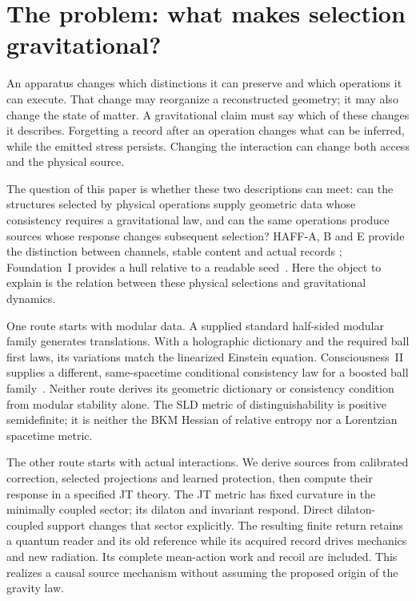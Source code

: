 \documentclass[12pt,a4paper]{article}
\begin{document}
\section{The problem: what makes selection gravitational?}
\label{sec:intro}

An apparatus changes which distinctions it can preserve and which operations
it can execute. That change may reorganize a reconstructed geometry; it may
also change the state of matter. A gravitational claim must say which of
these changes it describes. Forgetting a record after an operation changes
what can be inferred, while the emitted stress persists. Changing the
interaction can change both access and the physical source.

The question of this paper is whether these two descriptions can meet:
can the structures selected by physical operations supply geometric data
whose consistency requires a gravitational law, and can the same operations
produce sources whose response changes subsequent selection? HAFF-A, B and E
provide the distinction between channels, stable content and actual records
\cite{Liu2026PaperA,Liu2026PaperB}; Foundation~I provides a hull relative to a
readable seed~\cite{FoundationI}. Here the object to explain is the relation
between these physical selections and gravitational dynamics.

One route starts with modular data. A supplied standard half-sided modular
family generates translations. With a holographic dictionary and the required
ball first laws, its variations match the linearized Einstein equation.
Consciousness~II supplies a different, same-spacetime conditional consistency
law for a boosted ball family~\cite{PaperCII}. Neither route derives its
geometric dictionary or consistency condition from modular stability alone.
The SLD metric of distinguishability is positive semidefinite; it is neither
the BKM Hessian of relative entropy nor a Lorentzian spacetime metric.

The other route starts with actual interactions. We derive sources from
calibrated correction, selected projections and learned protection, then
compute their response in a specified JT theory. The JT metric has fixed
curvature in the minimally coupled sector; its dilaton and invariant respond.
Direct dilaton-coupled support changes that sector explicitly. The resulting
finite return retains a quantum reader and its old reference while its acquired
record drives mechanics and new radiation. Its complete mean-action work and
recoil are included. This realizes a causal source mechanism without assuming
the proposed origin of the gravity law.
\end{document}
